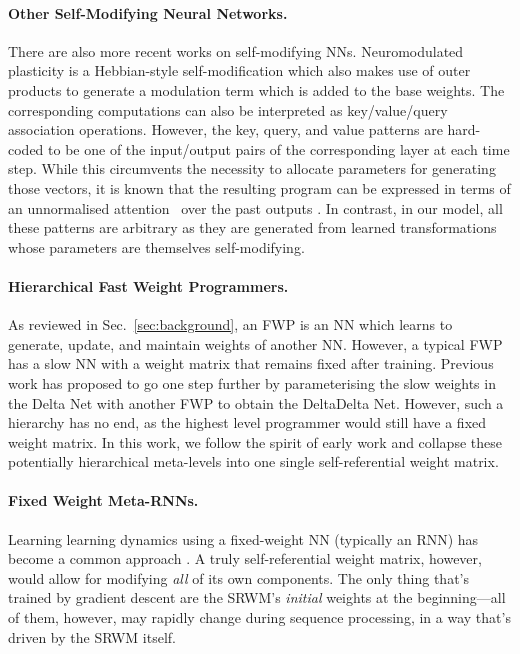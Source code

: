 \documentclass[nohyperref]{article}
\theoremstyle{plain}
\theoremstyle{definition}
\theoremstyle{remark}
\begin{document}
\paragraph{Other Self-Modifying Neural Networks.}
There are also more recent works on self-modifying NNs.
Neuromodulated plasticity is a Hebbian-style self-modification \citep{miconi18a, miconi2018backpropamine, Schmidgall20, NajarroR20} which also makes use of outer products to generate a modulation term which is added to the base weights.
The corresponding computations can also be interpreted as
key/value/query association operations.
However, the key, query, and value patterns are hard-coded to be one of the input/output pairs
of the corresponding layer at each time step.
While this circumvents the necessity to allocate parameters for generating those vectors,
it is known that the resulting program can be expressed in terms of an unnormalised attention~\citep{schmidhuber1993reducing}
over the past outputs \citep{ba2016using}.
In contrast, in our model, all these patterns are arbitrary as they are generated from learned 
transformations whose parameters are themselves self-modifying.


\paragraph{Hierarchical Fast Weight Programmers.}
As reviewed in Sec.~\ref{sec:background},
an FWP is an NN which learns to generate, update, and maintain weights of another NN.
However, a typical FWP has a slow NN with a weight matrix that remains fixed after training.
Previous work \citep{irie2021going} has proposed to go one step further by parameterising the slow weights
in the Delta Net with another FWP to obtain the DeltaDelta Net. 
However, such a hierarchy has no end, as the highest level programmer
would still have a fixed weight matrix.
In this work, we follow the spirit of early work \citep{Schmidhuber:92selfref, Schmidhuber:93selfrefann, Schmidhuber:93selfreficann, Schmidhuber:93selfrefieee, schmidhuber1993reducing} and
collapse these potentially hierarchical meta-levels into one single self-referential weight matrix.

\paragraph{Fixed Weight Meta-RNNs.}
Learning learning dynamics using a fixed-weight NN (typically an RNN) has become a common
approach \citep{hochreiter2001learning, cotter1990fixed, cotter1991learning, SantoroBBWL16, wang2016learning, duan2016rl, MunkhdalaiY17, MunkhdalaiSWT19, kirsch2020meta, sandler21}.
A truly self-referential weight matrix, however, would allow for modifying {\em all} of its own components. The only thing that's trained by gradient descent are the SRWM's {\em initial} weights at the beginning---all of them, however, may rapidly change during sequence processing, in a way that's driven by the SRWM itself. 
\end{document}
